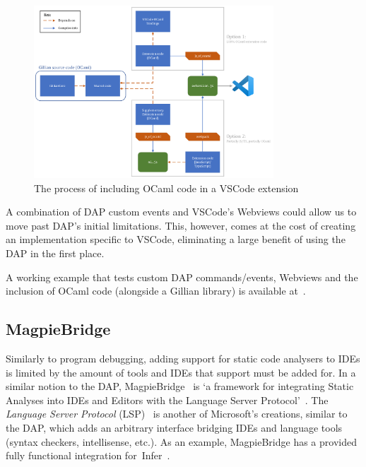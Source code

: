 \begin{figure}
  \center{}
  \includegraphics[width=0.8\textwidth]{img/vscode-extension-with-ocaml.png}
  \caption{The process of including OCaml code in a VSCode extension}\label{fig:vscode-extension-with-ocaml}
\end{figure}

\label{sec:background:extending-dap}
A combination of DAP custom events and VSCode's Webviews could allow us to move
past DAP's initial limitations. This, however, comes at the cost of creating an
implementation specific to VSCode, eliminating a large benefit of using the DAP
in the first place.

A working example that tests custom DAP commands/events, Webviews and the
inclusion of OCaml code (alongside a Gillian library) is available
at~\cite{debugger-experiment}.

\subsection{MagpieBridge}

Similarly to program debugging, adding support for static code analysers to IDEs
is limited by the amount of tools and IDEs that support must be added for. In a
similar notion to the DAP, MagpieBridge~\cite{magpiebridge} is `a framework for
integrating Static Analyses into IDEs and Editors with the Language Server
Protocol'~\cite{magpiebridge-repo}. The \textit{Language Server Protocol}
(LSP)~\cite{lsp} is another of Microsoft's creations, similar to the DAP, which
adds an arbitrary interface bridging IDEs and language tools (syntax checkers,
intellisense, etc.). As an example, MagpieBridge has a provided fully
functional integration for~Infer~\cite{infer-ide}.

